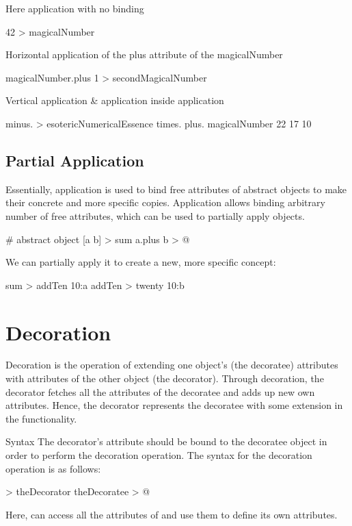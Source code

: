 \documentclass[12pt]{book}
\begin{document}
Here application with no binding
\begin{ffcode}
42 > magicalNumber
\end{ffcode}
Horizontal application of the plus attribute of the magicalNumber
\begin{ffcode}
magicalNumber.plus 1 > secondMagicalNumber
\end{ffcode}
Vertical application \& application inside application
\begin{ffcode}
minus. > esotericNumericalEssence
  times.
    plus.
      magicalNumber
      22
    17
  10
\end{ffcode}

\subsection{Partial Application}

Essentially, application is used to bind free attributes of abstract objects to make their concrete and more specific copies. Application allows binding arbitrary number of free attributes, which can be used to partially apply objects.

\begin{ffcode}
# abstract object
[a b] > sum
  a.plus b > @
\end{ffcode}
We can partially apply it to create a new, more specific concept:
\begin{ffcode}
sum > addTen
  10:a
addTen > twenty
  10:b
\end{ffcode}

\section{Decoration} \label{sec:decoration}
Decoration is the operation of extending one object's (the decoratee) attributes with attributes of the other object (the decorator). Through decoration, the decorator fetches all the attributes of the decoratee and adds up new own attributes. Hence, the decorator represents the decoratee with some extension in the functionality.

Syntax
The decorator's  attribute should be bound to the decoratee object in order to perform the decoration operation.
The syntax for the decoration operation is as follows:

\begin{ffcode}
[] > theDecorator
  theDecoratee > @
\end{ffcode}
Here,  can access all the attributes of  and use them to define its own attributes.
\end{document}
